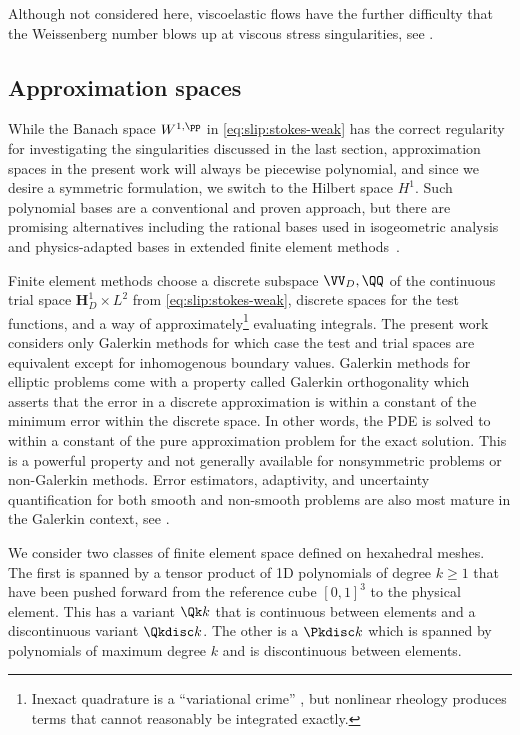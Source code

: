 Although not considered here, viscoelastic flows have the further difficulty that the Weissenberg number blows up at viscous stress singularities, see \cite{lipscomb1987implications,davies1988reentrant,hinch1993flow,owens2002cr}.

\subsection{Approximation spaces}\label{sssec:approximation}
While the Banach space $W^{1,\pp}$ in \eqref{eq:slip:stokes-weak} has the correct regularity for investigating the singularities discussed in the last section, approximation spaces in the present work will always be piecewise polynomial, and since we desire a symmetric formulation, we switch to the Hilbert space $H^1$.
Such polynomial bases are a conventional and proven approach, but there are promising alternatives including the rational bases used in isogeometric analysis~\cite{hughes2005isogeometric,cottrell2009isogeometric} and physics-adapted bases in extended finite element methods~\cite{belytschko2009review,mohammadi2008extended}.

Finite element methods choose a discrete subspace $\VV_D,\QQ$ of the continuous trial space $\bm H_D^1 \times L^2$ from \eqref{eq:slip:stokes-weak}, discrete spaces for the test functions, and a way of approximately\footnote{Inexact quadrature is a ``variational crime'' \cite{brenner2008mathematical}, but nonlinear rheology produces terms that cannot reasonably be integrated exactly.} evaluating integrals.
The present work considers only Galerkin methods for which case the test and trial spaces are equivalent except for inhomogenous boundary values.
Galerkin methods for elliptic problems come with a property called Galerkin orthogonality which asserts that the error in a discrete approximation is within a constant of the minimum error within the discrete space.
In other words, the PDE is solved to within a constant of the pure approximation problem for the exact solution.
This is a powerful property and not generally available for nonsymmetric problems or non-Galerkin methods.
Error estimators, adaptivity, and uncertainty quantification for both smooth and non-smooth problems are also most mature in the Galerkin context, see \cite{ainsworth1997pee,matthies2005gml,babuska2005scm,barth2010mlmcfe}.

We consider two classes of finite element space defined on hexahedral meshes.
The first is spanned by a tensor product of 1D polynomials of degree $k \ge 1$ that have been pushed forward from the reference cube $[0,1]^3$ to the physical element.
This has a variant $\Qk k$ that is continuous between elements and a discontinuous variant $\Qkdisc k$.
The other is a $\Pkdisc k$ which is spanned by polynomials of maximum degree $k$ and is discontinuous between elements.

